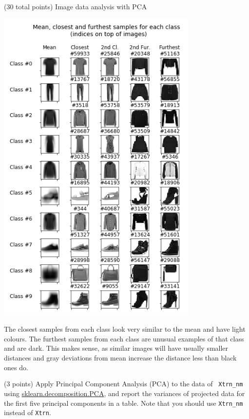 \documentclass[12pt]{article}
\begin{document}
\begin{question}{(30 total points) Image data analysis with PCA}
\begin{subquestion}
  \begin{answerbox}{52em}
    \begin{center}
	\includegraphics[width=0.75\textwidth]{imgs/1_2.png}
	\end{center}
	The closest samples from each class look very similar to the mean and have light colours. The furthest samples from each class are unusual examples of that class and are dark. This makes sense, as similar images will have usually smaller distances and gray deviations from mean increase the distance less than black ones do. 
  \end{answerbox}



   \end{subquestion}

   \begin{subquestion}{(3 points)
       Apply Principal Component Analysis (PCA) to the data of {\tt
         Xtrn\_nm} using
       \href{https://scikit-learn.org/0.19/modules/generated/sklearn.decomposition.PCA.html}{sklearn.decomposition.PCA},
       and report the variances of projected data for the first five principal
       components in a table. 
       Note that you should use {\tt Xtrn\_nm} instead of {\tt Xtrn}.
           } \label{Q1.pca.variance}




\end{subquestion}
\end{question}
\end{document}
